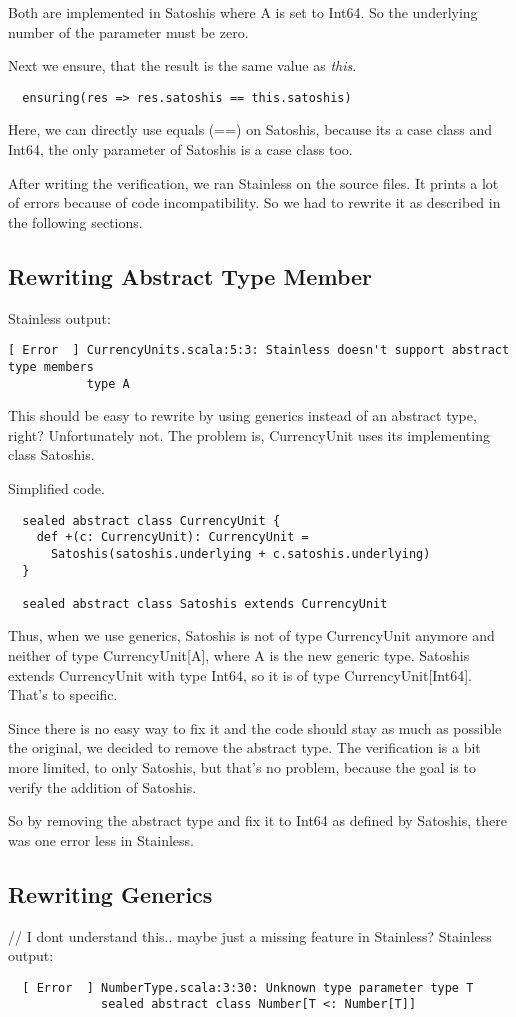 Both are implemented in Satoshis where A is set to Int64.
So the underlying number of the parameter must be zero.

Next we ensure, that the result is the same value as \emph{this}.
\begin{lstlisting}
  ensuring(res => res.satoshis == this.satoshis)
\end{lstlisting}
Here, we can directly use equals (==) on Satoshis, because its a case class and Int64, the only parameter of Satoshis is a case class too.

After writing the verification, we ran Stainless on the source files.
It prints a lot of errors because of code incompatibility.
So we had to rewrite it as described in the following sections.

\subsection{Rewriting Abstract Type Member}
Stainless output:
\begin{lstlisting}
[ Error  ] CurrencyUnits.scala:5:3: Stainless doesn't support abstract type members
           type A
\end{lstlisting}
This should be easy to rewrite by using generics instead of an abstract type, right?
Unfortunately not.
The problem is, CurrencyUnit uses its implementing class Satoshis.

Simplified code.
\begin{lstlisting}
  sealed abstract class CurrencyUnit {
    def +(c: CurrencyUnit): CurrencyUnit =
      Satoshis(satoshis.underlying + c.satoshis.underlying)
  }

  sealed abstract class Satoshis extends CurrencyUnit
\end{lstlisting}
Thus, when we use generics, Satoshis is not of type CurrencyUnit anymore and neither of type CurrencyUnit[A], where A is the new generic type.
Satoshis extends CurrencyUnit with type Int64, so it is of type CurrencyUnit[Int64].
That's to specific.

Since there is no easy way to fix it and the code should stay as much as possible the original, we decided to remove the abstract type.
The verification is a bit more limited, to only Satoshis, but that's no problem, because the goal is to verify the addition of Satoshis.

So by removing the abstract type and fix it to Int64 as defined by Satoshis, there was one error less in Stainless.

\subsection{Rewriting Generics}
// I dont understand this.. maybe just a missing feature in Stainless?
Stainless output:
\begin{lstlisting}
  [ Error  ] NumberType.scala:3:30: Unknown type parameter type T
             sealed abstract class Number[T <: Number[T]]

\end{lstlisting}

